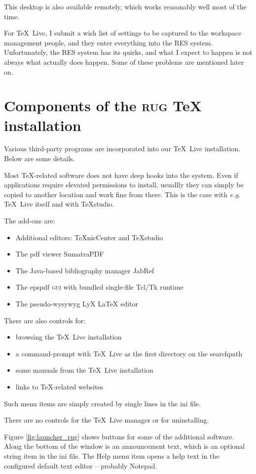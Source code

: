 \documentclass[11pt,a4paper,oneside]{report}
\def\TL{\TeX~Live}
\def\mysc#1{{\rmfamily\textsc{#1}}}
\def\GUI{\mysc{gui}}
\def\RUG{\mysc{rug}}
\def\TNC{TeXnicCenter}
\def\TS{TeXstudio}
\begin{document}
This desktop is also available remotely, which works reasonably well
most of the time.

For \TL, I submit a wish list of settings to be captured to the
workspace management people, and they enter everything into the RES
system. Unfortunately, the RES system has its quirks, and what I
expect to happen is not always what actually does happen. Some of
these problems are mentioned later on.

\section{Components of the \RUG{} \TeX{} installation}
\label{sec:comps}

Various third-party programs are incorporated into our \TL{}
installation. Below are some details.

Most \TeX-related software does not have deep hooks into the
system. Even if applications require elevated permissions to
install, usuallly they can simply be copied to another location and
work fine from there. This is the case with \emph{e.g.}  \TL{}
itself and with \TS.

The add-ons are:
\begin{itemize}
\item Additional editors: \TNC{} and \TS{}
\item The pdf viewer SumatraPDF
\item The Java-based bibliography manager JabRef
\item The epspdf \GUI{} with bundled single-file Tcl/Tk runtime
\item The pseudo-wysywyg LyX \LaTeX{} editor
\end{itemize}
There are also controls for:
\begin{itemize}
\item browsing the \TL{} installation
\item a command-prompt with \TL{} as the first directory on the
  searchpath
\item some manuals from the \TL{} installation
\item links to \TeX-related websites
\end{itemize}
Such menu items are simply created by single lines in the
ini file.

There are no controls for the \TL{} manager or for uninstalling.

Figure \ref{fig:launcher_rug} shows buttons for some of the
additional software. Along the bottom of the window is an
announcement text, which is an optional string item in the ini
file. The Help menu item opens a help text in the configured default
text editor -- probably Notepad.
\end{document}
